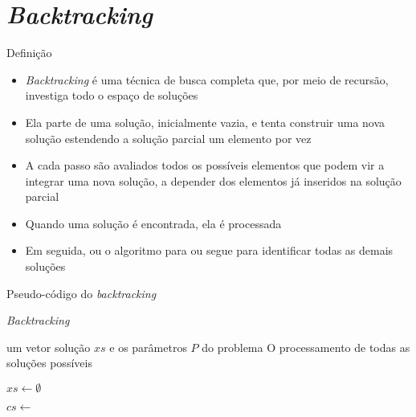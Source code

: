 \section{\it Backtracking}

\begin{frame}[fragile]{Definição}

    \begin{itemize}
        \item \textit{Backtracking} é uma técnica de busca completa que, por meio de recursão,
            investiga todo o espaço de soluções

        \item Ela parte de uma solução, inicialmente vazia, e tenta construir uma nova solução
            estendendo a solução parcial um elemento por vez

        \item A cada passo são avaliados todos os possíveis elementos que podem vir a integrar
            uma nova solução, a depender dos elementos já inseridos na solução parcial

        \item Quando uma solução é encontrada, ela é processada

        \item Em seguida, ou o algoritmo para ou segue para identificar todas as demais soluções

    \end{itemize}

\end{frame}

\begin{frame}[fragile]{Pseudo-código do {\it backtracking}}

    \begin{algorithm}[H]
        \caption{\it Backtracking}

        \begin{algorithmic}[1]
            \Require um vetor solução $xs$ e os parâmetros $P$ do problema
            \Ensure O processamento de todas as soluções possíveis

            \State $xs \gets \emptyset$
            \State 
 
                    \State {}
                \Else
                    \State $cs \gets $ 

                        \State {}
                        \State {}
                        \State {}
                        \State {}
                        \State {}
                    \EndFor
                \EndIf
            \EndFunction
        \end{algorithmic}
    \end{algorithm}

\end{frame}

